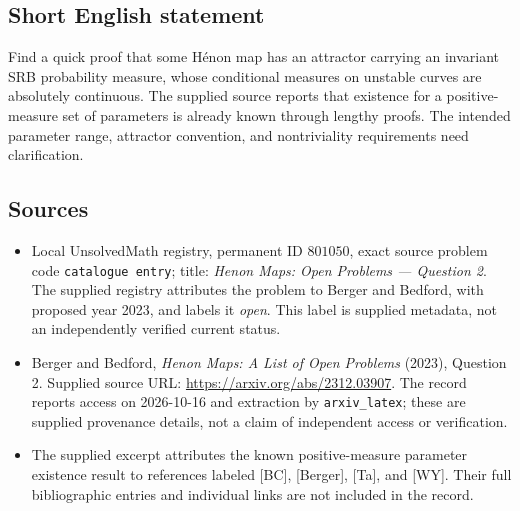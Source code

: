 \documentclass[11pt]{article}
\begin{document}
\subsection{Short English statement}
Find a quick proof that some H\'enon map has an attractor carrying an invariant SRB probability measure, whose conditional measures on unstable curves are absolutely continuous. The supplied source reports that existence for a positive-measure set of parameters is already known through lengthy proofs. The intended parameter range, attractor convention, and nontriviality requirements need clarification.
\subsection{Sources}
\begin{itemize}
\item Local UnsolvedMath registry, permanent ID \(801050\), exact source problem code \texttt{catalogue entry}; title: \emph{Henon Maps: Open Problems --- Question 2}. The supplied registry attributes the problem to Berger and Bedford, with proposed year 2023, and labels it \emph{open}. This label is supplied metadata, not an independently verified current status.
\item Berger and Bedford, \emph{Henon Maps: A List of Open Problems} (2023), Question 2. Supplied source URL: \url{https://arxiv.org/abs/2312.03907}. The record reports access on 2026-10-16 and extraction by \texttt{arxiv\_latex}; these are supplied provenance details, not a claim of independent access or verification.
\item The supplied excerpt attributes the known positive-measure parameter existence result to references labeled [BC], [Berger], [Ta], and [WY]. Their full bibliographic entries and individual links are not included in the record.
\end{itemize}
\end{document}
